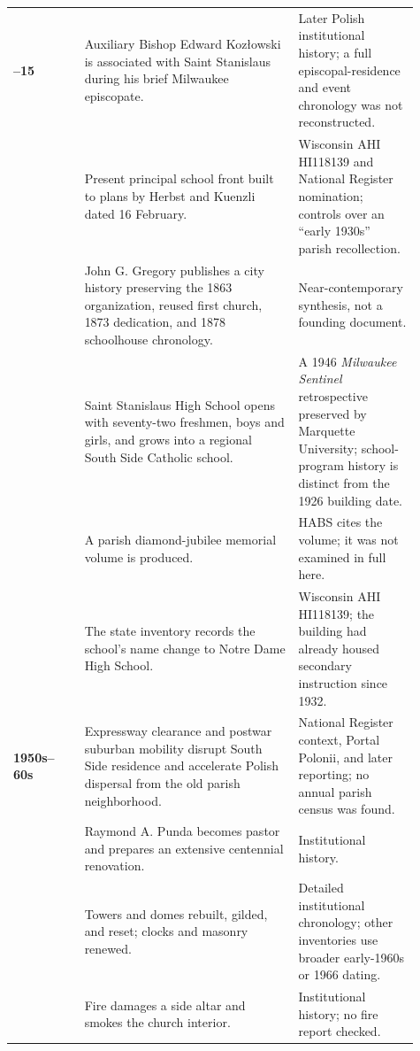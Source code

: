 \begin{longtable}{>{\bfseries\RaggedRight\arraybackslash}p{0.16\linewidth}>{\RaggedRight\arraybackslash}p{0.48\linewidth}>{\RaggedRight\arraybackslash}p{0.27\linewidth}}
1914--15 & Auxiliary Bishop Edward Kozłowski is associated with Saint Stanislaus during his brief Milwaukee episcopate. & Later Polish institutional history; a full episcopal-residence and event chronology was not reconstructed.\\

1926 & Present principal school front built to plans by Herbst and Kuenzli dated 16 February. & Wisconsin AHI HI118139 and National Register nomination; controls over an ``early 1930s'' parish recollection.\\

1931 & John G. Gregory publishes a city history preserving the 1863 organization, reused first church, 1873 dedication, and 1878 schoolhouse chronology. & Near-contemporary synthesis, not a founding document.\\

1932 & Saint Stanislaus High School opens with seventy-two freshmen, boys and girls, and grows into a regional South Side Catholic school. & A 1946 \emph{Milwaukee Sentinel} retrospective preserved by Marquette University; school-program history is distinct from the 1926 building date.\\

1941 & A parish diamond-jubilee memorial volume is produced. & HABS cites the volume; it was not examined in full here.\\

1947 & The state inventory records the school's name change to Notre Dame High School. & Wisconsin AHI HI118139; the building had already housed secondary instruction since 1932.\\

1950s--60s & Expressway clearance and postwar suburban mobility disrupt South Side residence and accelerate Polish dispersal from the old parish neighborhood. & National Register context, Portal Polonii, and later reporting; no annual parish census was found.\\

1958 & Raymond A. Punda becomes pastor and prepares an extensive centennial renovation. & Institutional history.\\

1960 & Towers and domes rebuilt, gilded, and reset; clocks and masonry renewed. & Detailed institutional chronology; other inventories use broader early-1960s or 1966 dating.\\

1962 & Fire damages a side altar and smokes the church interior. & Institutional history; no fire report checked.\\


\end{longtable}
